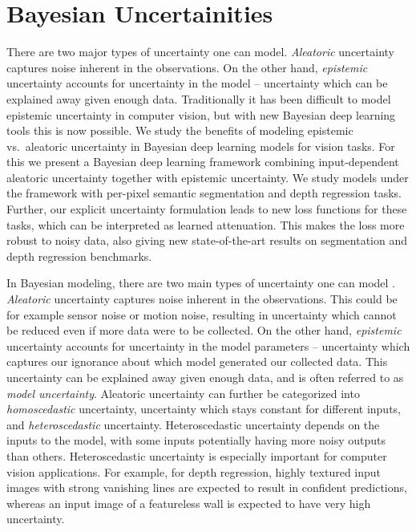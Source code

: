 \section{Bayesian Uncertainities}

There are two major types of uncertainty one can model. \textit{Aleatoric} uncertainty captures noise inherent in the observations. On the other hand, \textit{epistemic} uncertainty accounts for uncertainty in the model -- uncertainty which can be explained away given enough data. Traditionally it has been difficult to model epistemic uncertainty in computer vision, but with new Bayesian deep learning tools this is now possible.
We study the benefits of modeling epistemic vs.\ aleatoric uncertainty in Bayesian deep learning models for vision tasks. For this we present a Bayesian deep learning framework combining input-dependent aleatoric uncertainty together with epistemic uncertainty. We study models under the framework with per-pixel semantic segmentation and depth regression tasks. Further, our explicit uncertainty formulation leads to new loss functions for these tasks, which can be interpreted as learned attenuation. This makes the loss more robust to noisy data, also giving new state-of-the-art results on segmentation and depth regression benchmarks. 

In Bayesian modeling, there are two main types of uncertainty one can model \citep{der2009aleatory}. \textit{Aleatoric} uncertainty captures noise inherent in the observations.
This could be for example sensor noise or motion noise, resulting in uncertainty which cannot be reduced even if more data were to be collected.
On the other hand, \textit{epistemic} uncertainty accounts for uncertainty in the model parameters -- uncertainty which captures our ignorance about which model generated our collected data. 
This uncertainty can be explained away given enough data, and is often referred to as \textit{model uncertainty}. Aleatoric uncertainty can further be categorized into \textit{homoscedastic} uncertainty, uncertainty which stays constant for different inputs, and \textit{heteroscedastic} uncertainty. Heteroscedastic uncertainty depends on the inputs to the model, with some inputs potentially having more noisy outputs than others. 
Heteroscedastic uncertainty is especially important for computer vision applications. For example, for depth regression, highly textured input images with strong vanishing lines are expected to result in confident predictions, whereas an input image of a featureless wall is expected to have very high uncertainty.



